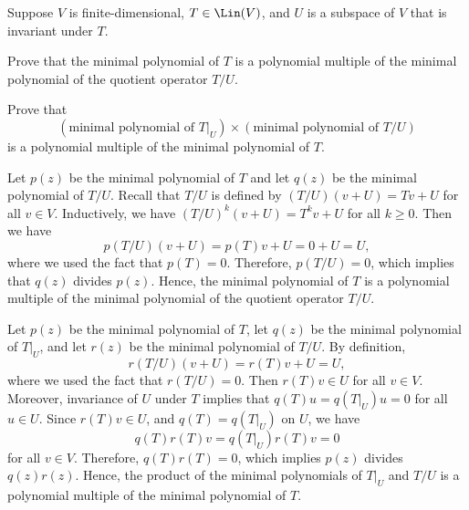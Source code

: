 \begin{exercise}
Suppose $V$ is finite-dimensional, $T\in\Lin(V)$, and $U$ is a subspace of $V$
that is invariant under $T$.
\begin{parts}
\item Prove that the minimal polynomial of $T$ is a polynomial multiple of the
  minimal polynomial of the quotient operator $T/U$.
\item Prove that
  \[ (\text{minimal polynomial of } T|_U)\times(\text{minimal polynomial of }
     T/U) \]
  is a polynomial multiple of the minimal polynomial of $T$.
\end{parts}
\end{exercise}
\begin{solution}\leavevmode
\begin{parts}
\item Let $p(z)$ be the minimal polynomial of $T$ and let $q(z)$ be the
  minimal polynomial of $T/U$. Recall that $T/U$ is defined by
  $(T/U)(v+U)=Tv+U$ for all $v\in V$. Inductively, we have
  $(T/U)^k(v+U)=T^kv+U$ for all $k\ge0$. Then we have
  \[ p(T/U)(v+U)=p(T)v+U=0+U=U, \]
  where we used the fact that $p(T)=0$. Therefore, $p(T/U)=0$, which implies
  that $q(z)$ divides $p(z)$. Hence, the minimal polynomial of $T$ is a
  polynomial multiple of the minimal polynomial of the quotient operator
  $T/U$.
\item Let $p(z)$ be the minimal polynomial of $T$, let $q(z)$ be the minimal
  polynomial of $T|_U$, and let $r(z)$ be the minimal polynomial of $T/U$. By
  definition,
  \[ r(T/U)(v+U)=r(T)v+U=U, \]
  where we used the fact that $r(T/U)=0$. Then $r(T)v\in U$ for all $v\in V$.
  Moreover, invariance of $U$ under $T$ implies that $q(T)u=q(T|_U)u=0$ for
  all $u\in U$. Since $r(T)v\in U$, and $q(T)=q(T|_U)$ on $U$, we have
  \[ q(T)r(T)v=q(T|_U)r(T)v=0 \]
  for all $v\in V$. Therefore, $q(T)r(T)=0$, which implies $p(z)$ divides
  $q(z)r(z)$. Hence, the product of the minimal polynomials of $T|_U$ and
  $T/U$ is a polynomial multiple of the minimal polynomial of $T$. \qedhere
\end{parts}
\end{solution}

